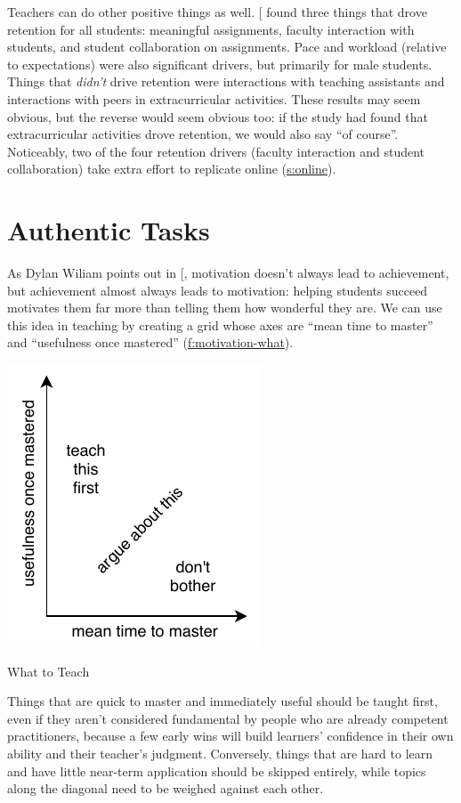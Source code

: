 Teachers can do other positive things as well. {[}\protect[\hyperlink{b:Bark2014}{Bark2014}]{]} found
three things that drove retention for all students: meaningful
assignments, faculty interaction with students, and student
collaboration on assignments. Pace and workload (relative to
expectations) were also significant drivers, but primarily for male
students. Things that \emph{didn't} drive retention were interactions with
teaching assistants and interactions with peers in extracurricular
activities. These results may seem obvious, but the reverse would seem
obvious too: if the study had found that extracurricular activities
drove retention, we would also say ``of course''. Noticeably, two of the
four retention drivers (faculty interaction and student collaboration)
take extra effort to replicate online (\protect\hyperlink{CHAPTER}{s:online}).

\section{Authentic Tasks}\label{s:motivation-authentic}

As Dylan Wiliam points out in {[}\protect[\hyperlink{b:Hend2017}{Hend2017}]{]}, motivation doesn't
always lead to achievement, but achievement almost always leads to
motivation: helping students succeed motivates them far more than
telling them how wonderful they are. We can use this idea in teaching by
creating a grid whose axes are ``mean time to master'' and ``usefulness
once mastered'' (\protect\hyperlink{FIGURE}{f:motivation-what}).

\includegraphics{../../files/what-to-teach.pdf}

What to Teach

Things that are quick to master and immediately useful should be taught
first, even if they aren't considered fundamental by people who are
already competent practitioners, because a few early wins will build
learners' confidence in their own ability and their teacher's judgment.
Conversely, things that are hard to learn and have little near-term
application should be skipped entirely, while topics along the diagonal
need to be weighed against each other.

